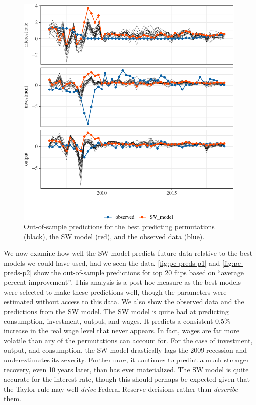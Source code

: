 \documentclass[11pt]{article}
\begin{document}
\begin{figure}[t]

{\centering \includegraphics{gfx/pc-preds-p2-1} 

}

\caption{Out-of-sample predictions for the best predicting permutations (black), the SW model (red), and the observed data (blue).}\label{fig:pc-preds-p2}
\end{figure}

We now examine how well the SW model predicts future data relative to
the best models we could have used, had we seen the data.
\autoref{fig:pc-preds-p1} and \autoref{fig:pc-preds-p2} show the
out-of-sample predictions for top 20 flips based on ``average percent
improvement''. This analysis is a post-hoc measure as the best models
were selected to make these predictions well, though the parameters were
estimated without access to this data. We also show the observed data
and the predictions from the SW model. The SW model is quite bad at
predicting consumption, investment, output, and wages. It predicts a
consistent 0.5\% increase in the real wage level that never appears. In
fact, wages are far more volatile than any of the permutations can
account for. For the case of investment, output, and consumption, the SW
model drastically lags the 2009 recession and underestimates its
severity. Furthermore, it continues to predict a much stronger recovery,
even 10 years later, than has ever materialized. The SW model is quite
accurate for the interest rate, though this should perhaps be expected
given that the Taylor rule may well \emph{drive} Federal Reserve
decisions rather than \emph{describe} them.
\end{document}
